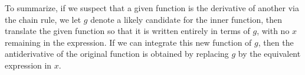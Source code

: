 \documentclass{ximera}
\begin{document}
To summarize, if we suspect that a given function is the derivative of
another via the chain rule, we let $g$ denote a likely candidate for
the inner function, then translate the given function so that it is
written entirely in terms of $g$, with no $x$ remaining in the
expression. If we can integrate this new function of $g$, then the
antiderivative of the original function is obtained by replacing $g$
by the equivalent expression in $x$.
\end{document}
